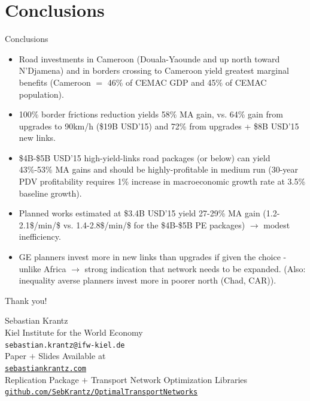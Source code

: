 \documentclass[aspectratio=169,xcolor=dvipsnames]{beamer}
\begin{document}
\section{Conclusions}

\begin{frame}{Conclusions}
  \begin{itemize} 
  	\item Road investments in Cameroon (Douala-Yaounde and up north toward N'Djamena) and in borders crossing to Cameroon yield greatest marginal benefits (Cameroon $=$ 46\% of CEMAC GDP and 45\% of CEMAC population).
  	\item 100\% border frictions reduction yields 58\% MA gain, vs. 64\% gain from upgrades to 90km/h (\$19B USD'15) and 72\% from upgrades + \$8B USD'15 new links. 
  	\item \$4B-\$5B USD'15 high-yield-links road packages (or below) can yield 43\%-53\% MA gains and should be highly-profitable in medium run (30-year PDV profitability requires 1\% increase in macroeconomic growth rate at 3.5\% baseline growth). 
  	\item Planned works estimated at \$3.4B USD'15 yield 27-29\% MA gain (1.2-2.1\$/min/\$ vs. 1.4-2.8\$/min/\$ for the \$4B-\$5B PE packages) $\to$ modest inefficiency.
    \item GE planners invest more in new links than upgrades if given the choice - unlike Africa \citep{krantz2024optimal} $\to$ strong indication that network needs to be expanded. (Also: inequality averse planners invest more in poorer north (Chad, CAR)).
  \end{itemize}
\end{frame}

\setcounter{totalframecount}{\value{framenumber}}

\begin{frame}[plain]
  \centering
    \vspace{0.8cm}
   \huge{\color{RoyalBlue}Thank you!}
   
  \vspace{0.5cm}
  
  \large{Sebastian Krantz}\\
  \small{Kiel Institute for the World Economy}\\
  \small{\texttt{sebastian.krantz@ifw-kiel.de}}\\ \vspace{1em}
  \small{Paper $+$ Slides Available at}\\
  \small{\href{https://sebastiankrantz.com}{\texttt{sebastiankrantz.com}}}\\ \vspace{1em}
  \small{Replication Package $+$ Transport Network Optimization Libraries}\\
  \small{\href{https://github.com/SebKrantz/OptimalTransportNetworks}{\texttt{github.com/SebKrantz/OptimalTransportNetworks}}}\\
  \vspace{0.3cm}
\end{frame}
\end{document}
